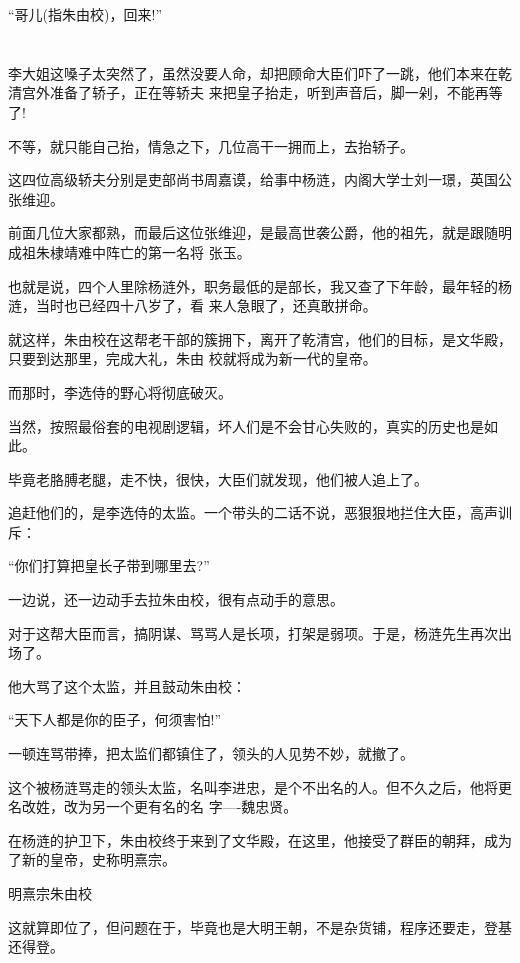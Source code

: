 \documentclass[11pt,a4paper,onecolumn]{article}
\begin{document}
``哥儿(指朱由校)，回来!''

\section[\thesection]{}

李大姐这嗓子太突然了，虽然没要人命，却把顾命大臣们吓了一跳，他们本来在乾清宫外准备了轿子，正在等轿夫
来把皇子抬走，听到声音后，脚一剁，不能再等了!

不等，就只能自己抬，情急之下，几位高干一拥而上，去抬轿子。

这四位高级轿夫分别是吏部尚书周嘉谟，给事中杨涟，内阁大学士刘一璟，英国公张维迎。

前面几位大家都熟，而最后这位张维迎，是最高世袭公爵，他的祖先，就是跟随明成祖朱棣靖难中阵亡的第一名将
张玉。

也就是说，四个人里除杨涟外，职务最低的是部长，我又查了下年龄，最年轻的杨涟，当时也已经四十八岁了，看
来人急眼了，还真敢拼命。

就这样，朱由校在这帮老干部的簇拥下，离开了乾清宫，他们的目标，是文华殿，只要到达那里，完成大礼，朱由
校就将成为新一代的皇帝。

而那时，李选侍的野心将彻底破灭。

当然，按照最俗套的电视剧逻辑，坏人们是不会甘心失败的，真实的历史也是如此。

毕竟老胳膊老腿，走不快，很快，大臣们就发现，他们被人追上了。

追赶他们的，是李选侍的太监。一个带头的二话不说，恶狠狠地拦住大臣，高声训斥：

``你们打算把皇长子带到哪里去?''

一边说，还一边动手去拉朱由校，很有点动手的意思。

对于这帮大臣而言，搞阴谋、骂骂人是长项，打架是弱项。于是，杨涟先生再次出场了。

他大骂了这个太监，并且鼓动朱由校：

``天下人都是你的臣子，何须害怕!''

一顿连骂带捧，把太监们都镇住了，领头的人见势不妙，就撤了。

这个被杨涟骂走的领头太监，名叫李进忠，是个不出名的人。但不久之后，他将更名改姓，改为另一个更有名的名
字----魏忠贤。

在杨涟的护卫下，朱由校终于来到了文华殿，在这里，他接受了群臣的朝拜，成为了新的皇帝，史称明熹宗。

明熹宗朱由校

这就算即位了，但问题在于，毕竟也是大明王朝，不是杂货铺，程序还要走，登基还得登。
\end{document}
